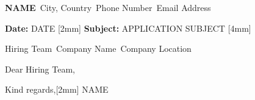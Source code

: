 \documentclass[a4paper,11pt]{letter}
\begin{document}

\begin{flushleft}
\textbf{NAME}\
City, Country\
Phone Number\
Email Address
\end{flushleft}

\vspace{0.7cm}


\begin{flushleft}
\textbf{Date:} DATE [2mm]
\textbf{Subject:} APPLICATION SUBJECT [4mm]

Hiring Team\
Company Name\
Company Location\
\end{flushleft}

\vspace{0.3cm}


{Dear Hiring Team,}

\vspace{0.3cm}





\vspace{0.5cm}


{Kind regards,[2mm]
NAME}
\end{document}
